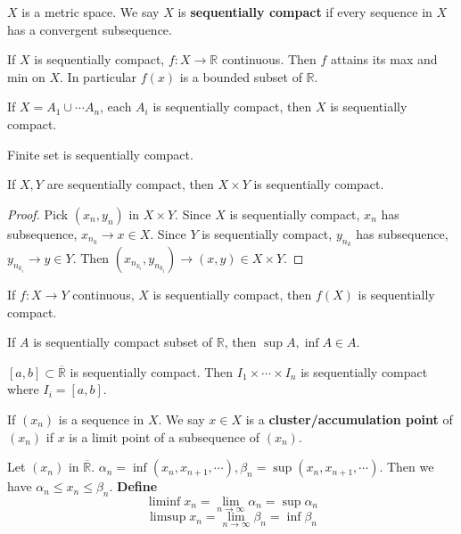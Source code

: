 
\begin{definition}
     $ X  $ is a metric space. We say  $ X  $ is \textbf{sequentially compact} if every sequence in  $ X  $ has a convergent subsequence.
\end{definition}
\begin{lemma}
    If  $ X  $ is sequentially compact,  $ f: X\rightarrow \mathbb{R }  $ continuous. Then  $ f  $ attains its max and min on  $ X  $. In particular  $ f(x) $ is a bounded subset of  $ \mathbb{R}  $.  
\end{lemma}
\begin{example}
    If  $ X=A_1\cup \cdots A_n  $, each  $ A_i  $ is sequentially compact, then  $ X  $ is sequentially compact.
\end{example}
\begin{example}
    Finite set is sequentially compact.
\end{example}
\begin{proposition}
    If  $ X,Y  $ are sequentially compact, then  $ X\times Y  $ is sequentially compact.
\end{proposition}
\begin{proof}
    Pick  $(x_n,y_n ) $ in  $ X\times Y  $. Since  $ X  $ is sequentially compact,  $  x_n  $ has subsequence,  $ x_{n_k}\rightarrow x\in X   $. Since  $ Y  $ is sequentially compact, $ y_{n_k} $ has subsequence,  $ y_{n_{k_i}} \rightarrow y\in Y$. Then  $ (x_{n_{k_i}},y_{n_{k_i}})\rightarrow(x,y)\in X\times Y $.   
\end{proof}
\begin{proposition}
    If  $ f:X\rightarrow Y  $ continuous,  $ X  $ is sequentially compact, then  $ f(X) $ is sequentially compact.
\end{proposition}
\begin{example}
    If  $ A  $ is sequentially compact subset of  $ \mathbb{R}  $, then  $ \sup A,\inf A \in A $. 
\end{example}
\begin{theorem}
     $ [a,b]\subset \overline{\mathbb{R} } $ is sequentially compact. Then  $ I_1\times \cdots \times I_n  $ is sequentially compact where  $ I_i=[a,b] $. 
\end{theorem}
\begin{definition}
    If  $ (x_n ) $ is a sequence in  $ X  $. We say  $ x\in X  $ is a \textbf{cluster/accumulation point} of  $ (x_n ) $ if  $ x  $ is a limit point of a subsequence of  $ (x_n ) $. 
\end{definition}
\begin{definition}
    Let  $ (x_n ) $ in  $ \overline{\mathbb{R} } $.  $ \alpha_n=\inf(x_n,x_{n+1},\cdots ),\beta_n=\sup(x_n,x_{n+1},\cdots) $. Then we have  $ \alpha_n  \leq x_n \leq\beta_n  $. \textbf{Define} 
    \[\liminf x_n=\lim_{n  \to \infty} \alpha_n=\sup \alpha_n  \]
    \[\limsup x_n=\lim_{n  \to \infty} \beta_n =\inf \beta_n \]
\end{definition}
